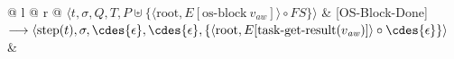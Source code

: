 \vspace{1.5em}

\noindent
\begin{tabular*}{\linewidth}{@{} l @{\extracolsep{\fill}} r @{}}
$\langle t, \sigma, Q, T, P \uplus \{ \langle \mathrm{root}, E[\mathrm{os\text{-}block}\ v_{\mathit{aw}}] \rangle \circ FS \} \rangle$ & [OS-Block-Done] \\
$\longrightarrow \langle \mathrm{step}(t), \sigma, \cdes{\epsilon}, \cdes{\epsilon}, \{ \langle \mathrm{root}, E[\mathrm{task\text{-}get\text{-}result}(v_{\mathit{aw}})] \rangle \circ \cdes{\epsilon} \} \rangle$ & \\
\end{tabular*}
